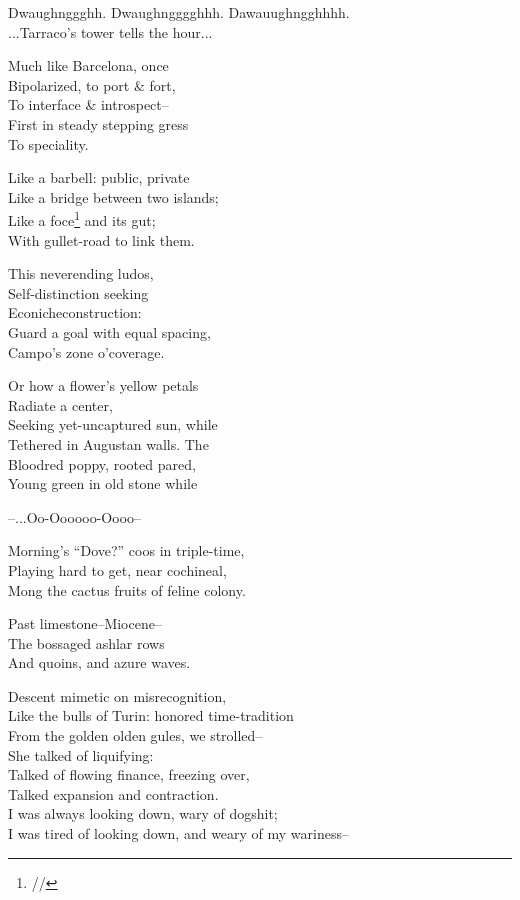 

Dwaughnggghh. Dwaughngggghhh. Dawauughngghhhh. \\
...Tarraco's tower tells the hour... 

Much like Barcelona, once \\
Bipolarized, to port \& fort, \\
To interface \& introspect-- \\
First in steady stepping gress \\
To speciality.

Like a barbell: public, private \\
Like a bridge between two islands; \\
Like a foce\footnote{//} and its gut; \\
With gullet-road to link them. 

This neverending ludos, \\
Self-distinction seeking \\
Econicheconstruction: \\
Guard a goal with equal spacing, \\
Campo's zone o'coverage.

Or how a flower's yellow petals \\
Radiate a center, \\
Seeking yet-uncaptured sun, while \\
Tethered in Augustan walls. The \\
Bloodred poppy, rooted pared, \\
Young green in old stone while

\qquad --...Oo-Oooooo-Oooo--

Morning's ``Dove?'' coos in triple-time, \\
Playing hard to get, near cochineal, \\
Mong the cactus fruits of feline colony.

Past limestone--Miocene-- \\
The bossaged ashlar rows \\
And quoins, and azure waves.

Descent mimetic on misrecognition, \\
Like the bulls of Turin: honored time-tradition \\
From the golden olden gules, we strolled-- \\
She talked of liquifying: \\
Talked of flowing finance, freezing over, \\
Talked expansion and contraction. \\
I was always looking down, wary of dogshit; \\
I was tired of looking down, and weary of my wariness--

